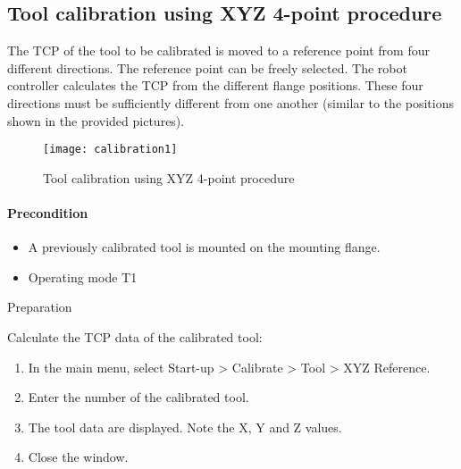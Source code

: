 		\subsection{Tool calibration using XYZ 4-point procedure}
			The TCP of the tool to be calibrated is moved to a reference point from four different directions. The reference point can be freely selected. The robot controller calculates the TCP from the different flange positions. These four directions must be sufficiently different from one another (similar to the positions shown in the provided pictures).
            \begin{figure}[H]
                \centering
                \texttt{[image: calibration1]}
                \caption{Tool calibration using XYZ 4-point procedure}
            \end{figure}
        
		\paragraph{Precondition}
		\begin{itemize}
			\item A previously calibrated tool is mounted on the mounting flange.
			\item Operating mode T1
		
		\end{itemize}
		
		Preparation
		
		Calculate the TCP data of the calibrated tool:
		\begin{enumerate}
			\item In the main menu, select Start-up > Calibrate > Tool > XYZ Reference.
			\item Enter the number of the calibrated tool.
			\item The tool data are displayed. Note the X, Y and Z values.
			\item Close the window.
		\end{enumerate}
		
